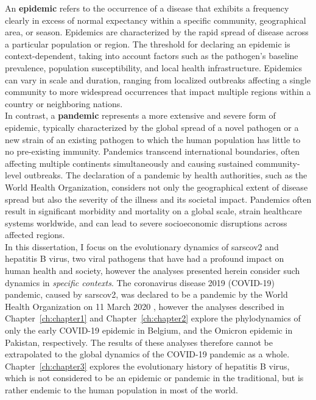 An \textbf{epidemic} refers to the occurrence of a disease that exhibits a frequency clearly in excess of normal expectancy within a specific community, geographical area, or season.
Epidemics are characterized by the rapid spread of disease across a particular population or region.
The threshold for declaring an epidemic is context-dependent, taking into account factors such as the pathogen's baseline prevalence, population susceptibility, and local health infrastructure.
Epidemics can vary in scale and duration, ranging from localized outbreaks affecting a single community to more widespread occurrences that impact multiple regions within a country or neighboring nations.\\

In contrast, a \textbf{pandemic} represents a more extensive and severe form of epidemic, typically characterized by the global spread of a novel pathogen or a new strain of an existing pathogen to which the human population has little to no pre-existing immunity.
Pandemics transcend international boundaries, often affecting multiple continents simultaneously and causing sustained community-level outbreaks.
The declaration of a pandemic by health authorities, such as the World Health Organization, considers not only the geographical extent of disease spread but also the severity of the illness and its societal impact.
Pandemics often result in significant morbidity and mortality on a global scale, strain healthcare systems worldwide, and can lead to severe socioeconomic disruptions across affected regions.\\

In this dissertation, I focus on the evolutionary dynamics of \gls{sarscov2} and hepatitis B virus, two viral pathogens that have had a profound impact on human health and society, however the analyses presented herein consider such dynamics in \textit{specific contexts}.
The coronavirus disease 2019 (COVID-19) pandemic, caused by \gls{sarscov2}, was declared to be a pandemic by the World Health Organization on 11 March 2020 \citep{healthorganization2020coronavirus}, however the analyses described in Chapter~\ref{ch:chapter1} and Chapter~\ref{ch:chapter2} explore the phylodynamics of only the early COVID-19 epidemic in Belgium, and the Omicron epidemic in Pakistan, respectively.
The results of these analyses therefore cannot be extrapolated to the global dynamics of the COVID-19 pandemic as a whole.
Chapter~\ref{ch:chapter3} explores the evolutionary history of hepatitis B virus, which is not considered to be an epidemic or pandemic in the traditional, but is rather endemic to the human population in most of the world.\\

